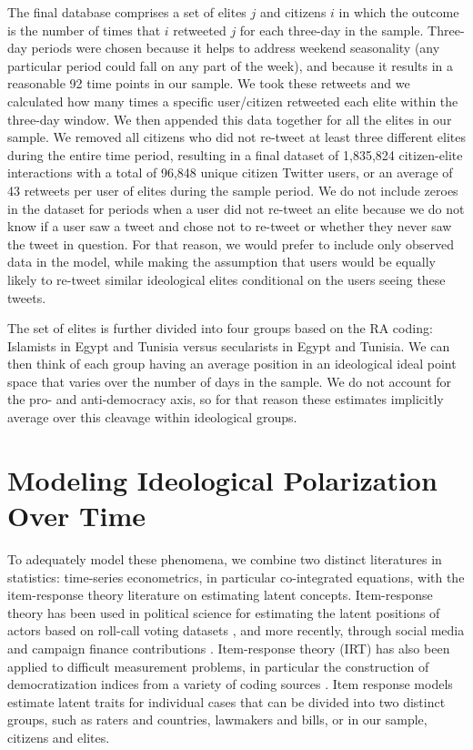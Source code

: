 \documentclass[12pt]{article}
\begin{document}
The final database comprises a set of elites $j$ and citizens $i$ in which the outcome is the number of times that $i$ retweeted $j$ for each three-day in the sample. Three-day periods were chosen because it helps to address weekend seasonality (any particular period could fall on any part of the week), and because it results in a reasonable 92 time points in our sample. We took these retweets and we calculated how many times a specific user/citizen retweeted each elite within the three-day window. We then appended this data together for all the elites in our sample. We removed all citizens who did not re-tweet at least three different elites during the entire time period, resulting in a final dataset of 1,835,824 citizen-elite interactions with a total of 96,848 unique citizen Twitter users, or an average of 43 retweets per user of elites during the sample period. We do not include zeroes in the dataset for periods when a user did not re-tweet an elite because we do not know if a user saw a tweet and chose not to re-tweet or whether they never saw the tweet in question. For that reason, we would prefer to include only observed data in the model, while making the assumption that users would be equally likely to re-tweet similar ideological elites conditional on the users seeing these tweets.

The set of elites is further divided into four groups based on the RA coding: Islamists in Egypt and Tunisia versus secularists in Egypt and Tunisia. We can then think of each group having an average position in an ideological ideal point space that varies over the number of days in the sample. We do not account for the pro- and anti-democracy axis, so for that reason these estimates implicitly average over this cleavage within ideological groups.

\section*{Modeling Ideological Polarization Over Time}
To adequately model these phenomena, we combine two distinct literatures in statistics: time-series econometrics, in particular co-integrated equations, with the item-response theory literature on estimating latent concepts. Item-response theory has been used in political science for estimating the latent positions of actors based on roll-call voting datasets \parencite{jackman2004}, and more recently, through social media and campaign finance contributions \parencite{bonica2014,barbera2015}. Item-response theory (IRT) has also been applied to difficult measurement problems, in particular the construction of democratization indices from a variety of coding sources \parencite{vdem2017,treier2008}. Item response models estimate latent traits for individual cases that can be divided into two distinct groups, such as raters and countries, lawmakers and bills, or in our sample, citizens and elites. 
\end{document}
